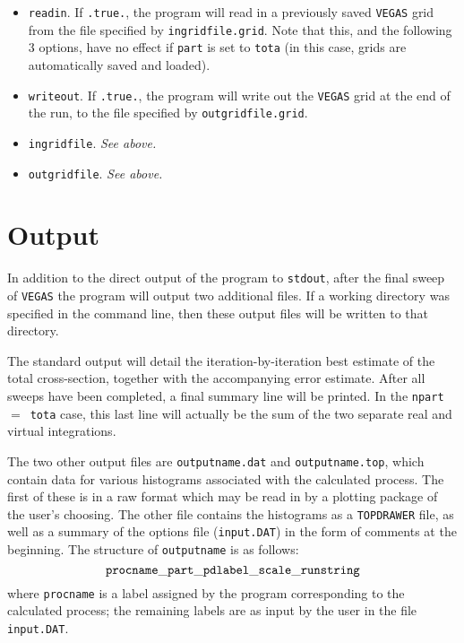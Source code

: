 \documentclass[12pt]{article}
\begin{document}
\begin{itemize}
\begin{center}
\{blank line\} \\
{\tt [How to resume/save a run] }
\end{center}

\item {\tt readin}. If {\tt .true.}, the program will read in a
previously saved {\tt VEGAS} grid from the file specified by
{\tt ingridfile.grid}. Note that this, and the following 3 options,
have no effect if {\tt part} is set to {\tt tota} (in this case, grids
are automatically saved and loaded).

\item {\tt writeout}. If {\tt .true.}, the program will write out
the {\tt VEGAS} grid at the end of the run, to the file specified by
{\tt outgridfile.grid}.

\item {\tt ingridfile}.  {\it See above.}

\item {\tt outgridfile}.  {\it See above.}

\end{itemize}

\section{Output}
 
In addition to the direct output of the program to {\tt stdout}, after
the final sweep of {\tt VEGAS} the program will output two additional files.
If a working directory was specified in the command line, then these
output files will be written to that directory.

The standard output will detail the iteration-by-iteration best estimate
of the total cross-section, together with the accompanying error estimate.
After all sweeps have been completed, a final summary line will be printed.
In the {\tt npart}~$=$~{\tt tota} case, this last line will actually be the
sum of the two separate real and virtual integrations.

The two other output files are {\tt outputname.dat} and
{\tt outputname.top}, which contain data for various histograms associated
with the calculated process. The first of these is in a raw format 
which may be read in by a plotting package of the user's choosing. The
other file contains the histograms as a {\tt TOPDRAWER} file, as well
as a summary of the options file ({\tt input.DAT}) in the form of
comments at the beginning. The structure
of {\tt outputname} is as follows:
\begin{displaymath}
{\tt procname\_part\_pdlabel\_scale\_runstring}
\end{displaymath}
where {\tt procname} is a label assigned by the program corresponding to
the calculated process; the remaining labels are as input by the user
in the file {\tt input.DAT}.
\end{document}
